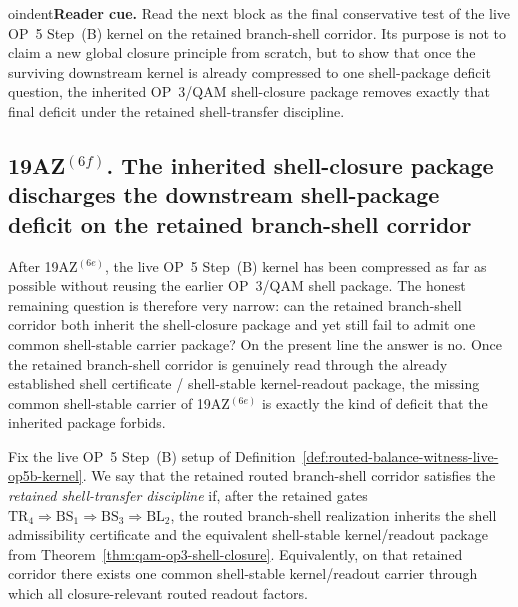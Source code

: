 oindent\textbf{Reader cue.} Read the next block as the final conservative test of the live OP~5 Step~(B) kernel on the retained branch-shell corridor. Its purpose is not to claim a new global closure principle from scratch, but to show that once the surviving downstream kernel is already compressed to one shell-package deficit question, the inherited OP~3/QAM shell-closure package removes exactly that final deficit under the retained shell-transfer discipline.

\subsection*{19AZ$^{(6f)}$. The inherited shell-closure package discharges the downstream shell-package deficit on the retained branch-shell corridor}
\label{sec:inherited-shell-closure-package-discharges-downstream-shell-package-deficit}
After 19AZ$^{(6e)}$, the live OP~5 Step~(B) kernel has been compressed as far as possible without reusing the earlier OP~3/QAM shell package. The honest remaining question is therefore very narrow: can the retained branch-shell corridor both inherit the shell-closure package and yet still fail to admit one common shell-stable carrier package? On the present line the answer is no. Once the retained branch-shell corridor is genuinely read through the already established shell certificate / shell-stable kernel-readout package, the missing common shell-stable carrier of 19AZ$^{(6e)}$ is exactly the kind of deficit that the inherited package forbids.

\begin{definition}
\label{def:retained-shell-transfer-discipline-live-op5b-kernel}
Fix the live OP~5 Step~(B) setup of Definition~\ref{def:routed-balance-witness-live-op5b-kernel}. We say that the retained routed branch-shell corridor satisfies the \emph{retained shell-transfer discipline} if, after the retained gates \(\mathrm{TR}_4\Rightarrow\mathrm{BS}_1\Rightarrow\mathrm{BS}_3\Rightarrow\mathrm{BL}_2\), the routed branch-shell realization inherits the shell admissibility certificate and the equivalent shell-stable kernel/readout package from Theorem~\ref{thm:qam-op3-shell-closure}. Equivalently, on that retained corridor there exists one common shell-stable kernel/readout carrier through which all closure-relevant routed readout factors.
\end{definition}

